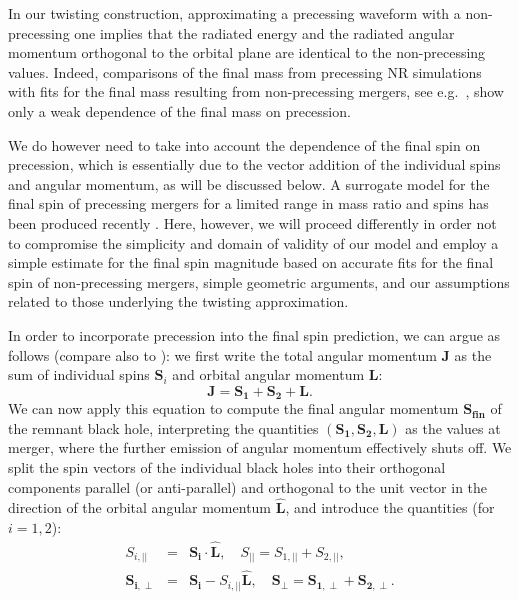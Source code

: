 \documentclass[%
aps,
prd,
amssymb,
amsmath,
amsfonts,
eqsecnum,
showpacs,
nofootinbib,
floatfix,
twocolumn,
twoside,
a4paper,
superscriptaddress
]{revtex4-1}
\begin{document}
In our twisting construction, approximating a precessing waveform with a non-precessing one implies that the radiated energy and the radiated angular momentum orthogonal to the orbital plane are identical to the 
non-precessing values.
%
Indeed,  comparisons of the final mass from precessing NR simulations with fits for the final mass resulting from non-precessing mergers, see e.g.~\cite{T1600168,Varma:2018aht}, show only a weak dependence of the final mass on precession.

We do however need to take into account the dependence of the final spin on precession, which is essentially due to the vector addition of the individual spins and angular momentum, as will be discussed below. 
A surrogate model for the final spin of precessing mergers for a limited range in mass ratio and spins has been produced recently \cite{Varma:2018aht}. Here, however, we will proceed differently in order not to compromise the simplicity and domain of validity of our model and employ a simple estimate for the final spin magnitude based on accurate fits for the final spin of non-precessing mergers, simple geometric arguments, and our assumptions related to those underlying the twisting approximation.  

In order to incorporate precession into the final spin prediction, we can argue as follows (compare also to  \cite{Rezzolla:2007rz}):
we first write the total angular momentum ${\mathbf J}$ as the sum of individual spins ${\mathbf S_i}$ and orbital angular momentum ${\mathbf L}$:
$$ 
\mathbf{J} = \mathbf{S_1}  + \mathbf{S_2}  + \mathbf{L}.
$$
We can now apply this equation to compute the final angular momentum $\mathbf{S_{fin}}$ of the remnant black hole, interpreting the quantities $(\mathbf{S_1}, \mathbf{S_2}, \mathbf{L})$ as the values at merger, where the further emission of angular momentum effectively shuts off.
We split the spin vectors of the individual black holes into their orthogonal components parallel (or anti-parallel) and orthogonal to the unit vector in the direction of the orbital angular momentum  $\mathbf{{\hat L}}$, and introduce the quantities (for $i=1,2$):
\begin{eqnarray}
S_{i,\vert\vert} &=&  \mathbf{S_{i}}\cdot \mathbf{\hat L}, \quad S_{\vert\vert} = S_{1,\vert\vert} + S_{2,\vert\vert}, \\
\mathbf{S_{i,\perp}} &=& \mathbf{S_{i}} - S_{i,\vert\vert} \mathbf{\hat L}, \quad
\mathbf{S_{\perp}} = \mathbf{S_{1,\perp}}+\mathbf{S_{2,\perp}}.
\end{eqnarray}
\end{document}
